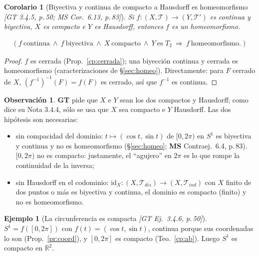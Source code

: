 \documentclass[11pt,a4paper]{article}
\newenvironment{lista}{\leavevmode\begin{itemize}[leftmargin=1.5em,itemsep=1pt,topsep=2pt,parsep=0pt]}{\end{itemize}}
\newcommand{\lgc}[1]{\par\vspace{-3pt}\begin{gather*}\big(\;#1\;\big)\end{gather*}\vspace{-6pt}}
\theoremstyle{definition}
\newtheorem{ejemplo}[definicion]{Ejemplo}
\newtheorem{observacion}[definicion]{Observación}
\theoremstyle{plain}
\newtheorem{corolario}[definicion]{Corolario}
\newcommand{\fnt}[1]{{\normalfont\small\itshape\color{gray!150!black}[#1]}}
\newcommand{\R}{\mathbb{R}}
\newcommand{\tp}{\mathcal{T}}
\begin{document}
\begin{corolario}[Biyectiva y continua de compacto a Hausdorff es homeomorfismo \fnt{GT 3.4.5, p.\,50; MS Cor.\ 6.13, p.\,83}]\label{cp:homeo}
Si $f:(X,\tp)\to(Y,\tp')$ es continua y biyectiva, $X$ es compacto e $Y$ es Hausdorff, entonces $f$ es un homeomorfismo.
\lgc{f\ \text{continua}\ \wedge\ f\ \text{biyectiva}\ \wedge\ X\ \text{compacto}\ \wedge\ Y\ \text{es }T_2\ \Rightarrow\ f\ \text{homeomorfismo}.}
\end{corolario}

\begin{proof}
$f$ es cerrada (Prop.~\ref{cp:cerrada}); una biyección continua y cerrada es homeomorfismo (caracterizaciones de \S\ref{sec:homeo}). Directamente: para $F$ cerrado de $X$, $(f^{-1})^{-1}(F)=f(F)$ es cerrado, así que $f^{-1}$ es continua.
\end{proof}

\begin{observacion}
\textbf{GT} pide que $X$ e $Y$ sean los dos compactos y Hausdorff; como dice su Nota 3.4.4, sólo se usa que $X$ sea compacto e $Y$ Hausdorff. Las dos hipótesis son necesarias:
\begin{lista}
\item sin compacidad del dominio: $t\mapsto(\cos t,\sin t)$ de $[0,2\pi)$ en $S^1$ es biyectiva y continua y no es homeomorfismo (\S\ref{sec:homeo}; \textbf{MS} Contraej.\ 6.4, p.\,83). $[0,2\pi)$ no es compacto: justamente, el ``agujero'' en $2\pi$ es lo que rompe la continuidad de la inversa;
\item sin Hausdorff en el codominio: $\mathrm{id}_X:(X,\tp_{dis})\to(X,\tp_{ind})$ con $X$ finito de dos puntos o más es biyectiva y continua, el dominio es compacto (finito) y no es homeomorfismo.
\end{lista}
\end{observacion}

\begin{ejemplo}[La circunferencia es compacta \fnt{GT Ej.\ 3.4.6, p.\,50}]
$S^1=f([0,2\pi])$ con $f(t)=(\cos t,\sin t)$, continua porque sus coordenadas lo son (Prop.~\ref{pr:coord}), y $[0,2\pi]$ es compacto (Teo.~\ref{cp:ab}). Luego $S^1$ es compacto en $\R^2$.
\end{ejemplo}
\end{document}
